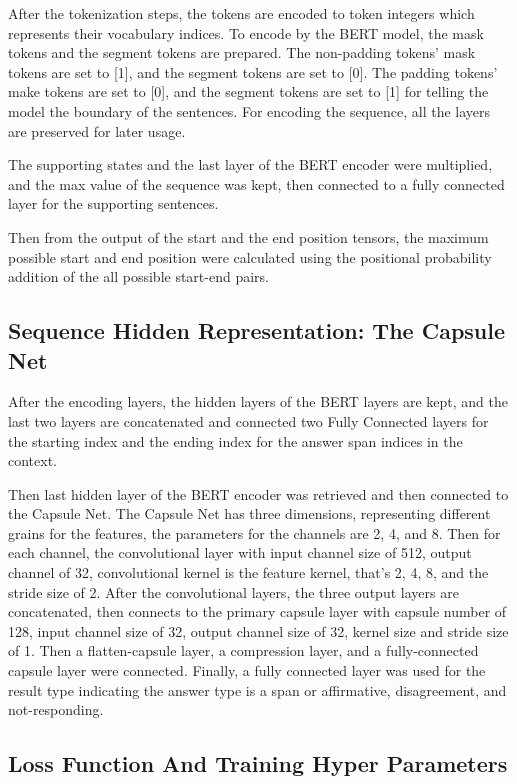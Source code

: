 \documentclass[11pt,a4paper]{article}
\begin{document}
After the tokenization steps, the tokens are encoded to token integers which represents their vocabulary indices.
To encode by the BERT model, the mask tokens and the segment tokens are prepared.
The non-padding tokens' mask tokens are set to [1], and the segment tokens are set to [0].
The padding tokens' make tokens are set to [0], and the segment tokens are set to [1] for telling the model the boundary of the sentences.
For encoding the sequence, all the layers are preserved for later usage.

The supporting states and the last layer of the BERT encoder were multiplied, and the max value of the sequence was kept,
then connected to a fully connected layer for the supporting sentences.

Then from the output of the start and the end position tensors, the maximum possible start and end position were calculated
using the positional probability addition of the all possible start-end pairs.

\subsection{Sequence Hidden Representation: The Capsule Net}

After the encoding layers, the hidden layers of the BERT layers are kept, and the last two layers are concatenated and connected
two Fully Connected layers for the starting index and the ending index for the answer span indices in the context.

Then last hidden layer of the BERT encoder was retrieved and then connected to the Capsule Net.
The Capsule Net has three dimensions, representing different grains for the features, the parameters for the channels are 2, 4, and 8.
Then for each channel, the convolutional layer with input channel size of 512, output channel of 32, convolutional kernel is the feature kernel,
that's 2, 4, 8, and the stride size of 2.
After the convolutional layers, the three output layers are concatenated,
then connects to the primary capsule layer with capsule number of 128, input channel size of 32, output channel size of 32, kernel size and stride size of 1.
Then a flatten-capsule layer, a compression layer, and a fully-connected capsule layer were connected.
Finally, a fully connected layer was used for the result type indicating the answer type is a span or affirmative, disagreement, and not-responding.



\subsection{Loss Function And Training Hyper Parameters}
\end{document}
